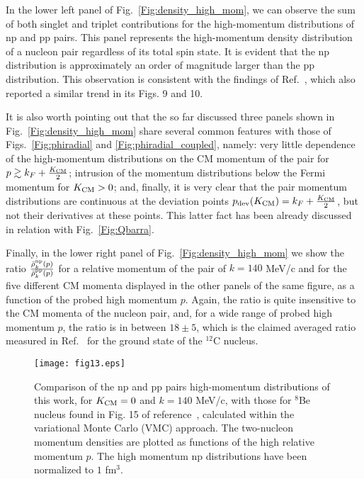 \documentclass[aps,twocolumn,showpacs,preprintnumbers,amsmath,amssymb,nofootinbib,superscriptaddress,showkeys,noeprint]{revtex4-1}
\begin{document}
In the lower left panel of Fig.~\ref{Fig:density_high_mom}, we can
observe the sum of both singlet and triplet contributions for the
high-momentum distributions of np and pp pairs. This panel represents
the high-momentum density distribution of a nucleon pair regardless of
its total spin state. It is evident that the np distribution is
approximately an order of magnitude larger than the pp distribution.
This observation is consistent with the findings of
Ref.~\cite{RuizSimo:2017tcb}, which also reported a similar trend in
its Figs. 9 and 10.

It is also worth pointing out that the so far discussed three panels
shown in Fig.~\ref{Fig:density_high_mom} share several common features
with those of Figs.~\ref{Fig:phiradial} and
\ref{Fig:phiradial_coupled}, namely: very little dependence of the
high-momentum distributions on the CM momentum of the pair for $p
\gtrsim k_F + \frac{K_{\rm CM}}{2}$; intrusion of the momentum
distributions below the Fermi momentum for $K_{\rm CM} > 0$; and,
finally, it is very clear that the pair momentum distributions are
continuous at the deviation points $p_{\rm dev}(K_{\rm
  CM})=k_F+\frac{K_{\rm CM}}{2}$, but not their derivatives at these
points.  This latter fact has been already discussed in relation with
Fig.~\ref{Fig:Qbarra}.

Finally, in the lower right panel of Fig.~\ref{Fig:density_high_mom}
we show the ratio $\frac{\bar{\rho}^{\rm np}_k(p)}{\bar{\rho}^{\rm
    pp}_k(p)}$ for a relative momentum of the pair of $k=140$ MeV/c
and for the five different CM momenta displayed in the other panels of
the same figure, as a function of the probed high momentum $p$.
Again, the ratio is quite insensitive to the CM momenta of the nucleon
pair, and, for a wide range of probed high momentum $p$, the ratio is
in between $18\pm 5$, which is the claimed averaged ratio measured in
Ref.~\cite{Subedi:2008zz} for the ground state of the ${}^{12}$C
nucleus.

\begin{figure}[!ht]
\centering
\texttt{[image: fig13.eps]}
\caption{Comparison of the np and pp pairs high-momentum distributions
  of this work, for $K_{\rm CM}=0$ and $k=140$ MeV/c, with those for
  ${}^8$Be nucleus found in Fig. 15 of
  reference~\cite{Wiringa:2013ala}, calculated within the variational
  Monte Carlo (VMC) approach. The two-nucleon momentum densities are
  plotted as functions of the high relative momentum $p$.  The high
  momentum np distributions have been normalized to $1$ fm${}^3$.}
\label{Fig:comparison_wiringa}
\end{figure}
\end{document}

